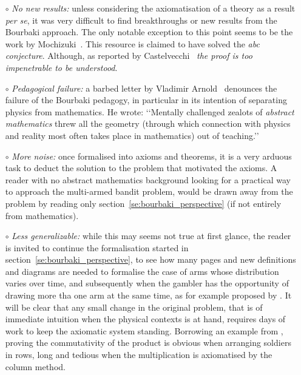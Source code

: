 \documentclass[]{scrartcl}
\theoremstyle{definition}
\begin{document}
\begin{itemize}

    \item[$\circ$] \emph{No new results:} unless considering the axiomatisation of a theory as a result \emph{per se}, it was very difficult to find breakthroughs or new results from the Bourbaki approach. The only notable exception to this point seems to be the work by Mochizuki~\cite{mochizuki2012inter}. This resource is claimed to have solved the \emph{abc conjecture}. Although, as reported by Castelvecchi~\cite{castelvecchi2015biggest} \emph{the proof is too impenetrable to be understood}.
     
    \item[$\circ$] \emph{Pedagogical failure:} a barbed letter by Vladimir Arnold~\cite{arnol1998teaching} denounces the failure of the Bourbaki pedagogy, in particular in its intention of separating physics from mathematics. He wrote: \lq\lq Mentally challenged zealots of \emph{abstract mathematics} threw all the geometry (through which connection with physics and reality most often takes place in mathematics) out of teaching.\rq\rq
    
    \item[$\circ$] \emph{More noise:} once formalised into axioms and theorems, it is a very arduous task to deduct the solution to the problem that motivated the axioms. A reader with no abstract mathematics background looking for a practical way to approach the multi-armed bandit problem, would be drawn away from the problem by reading only section~\ref{se:bourbaki_perspective} (if not entirely from mathematics).
     
    \item[$\circ$] \emph{Less generalizable:} while this may seems not true at first glance, the reader is invited to continue the formalisation started in section~\ref{se:bourbaki_perspective}, to see how many pages and new definitions and diagrams are needed to formalise the case of arms whose distribution varies over time, and subsequently when the gambler has the opportunity of drawing more tha one arm at the same time, as for example proposed by \cite{trovo2018improving}. It will be clear that any small change in the original problem, that is of immediate intuition when the physical contexts is at hand, requires days of work to keep the axiomatic system standing. Borrowing an example from \cite{arnol1998teaching}, proving the commutativity of the product is obvious when arranging soldiers in rows, long and tedious when the multiplication is axiomatised by the column method.
    

\end{itemize}
\end{document}

